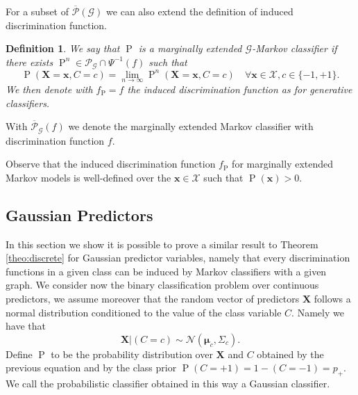 \documentclass[11pt,a4paper, twoside]{book}
\newtheorem{definition}{Definition}[chapter]
\newcommand{\Pp}{\operatorname{P}}
\newcommand{\bx}{\mathbf{x}}
\newcommand{\bX}{\mathbf{X}}
\newcommand{\bchi}{\boldsymbol{\mathcal{X}}}
\begin{document}
For a subset of $\overline{\mathcal{P}}({\mathcal{G}})$ we can also extend the definition of induced discrimination function. 


\begin{definition}
We say that $\Pp$ is a marginally extended $\mathcal{G}$-Markov classifier if there exists $\Pp^{n} \in \mathcal{P}_{\mathcal{G}} \cap \Psi^{-1}(f)$ such that
 $$  \Pp(\bX=\bx, C = c) = \lim _{n \to \infty} \Pp^{n}(\bX=\bx, C = c) \quad \forall \bx \in \bchi, c \in \{-1,+1\}.$$ 
We then denote with $f_{\Pp} = f$ the induced discrimination function as for generative classifiers.
\end{definition} 

With $\overline{\mathcal{P}}_{\mathcal{G}}(f)$ we denote the marginally extended Markov classifier with discrimination function $f$.

Observe that the induced discrimination function $f_{\Pp}$ for marginally extended Markov models is well-defined over the $\bx \in \bchi$ such that $\Pp(\bx)>0$.

\subsection{Gaussian Predictors}

In this section we show it is possible to prove a similar result to Theorem  \ref{theo:discrete} for Gaussian predictor variables, namely that every discrimination functions in a given class can be induced by Markov classifiers with a given graph.
We consider now the binary classification problem over continuous predictors, we assume moreover that the random vector of predictors $\mathbf{X}$ follows a normal distribution conditioned to the value of the class variable $C$. Namely we have that
$$ \mathbf{X} | (C=c) \sim \mathcal{N}(\boldsymbol{\mu}_c , \Sigma_c). $$
Define $\Pp$ to be the probability distribution over $\mathbf{X}$ and $C$ obtained by the previous equation and by the class prior $\Pp(C=+1)= 1-(C=-1)=p_+$.
We call the probabilistic classifier obtained in this way a Gaussian classifier.
\end{document}
